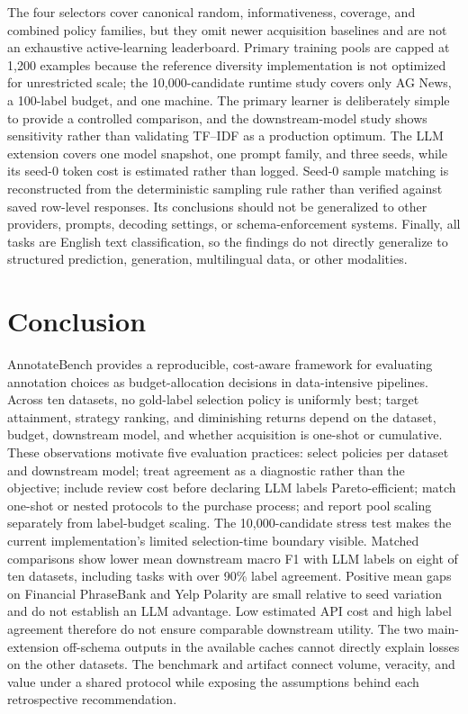 \documentclass[conference]{IEEEtran}
\begin{document}
The four selectors cover canonical random, informativeness, coverage, and combined policy families, but they omit newer acquisition baselines and are not an exhaustive active-learning leaderboard. Primary training pools are capped at 1,200 examples because the reference diversity implementation is not optimized for unrestricted scale; the 10,000-candidate runtime study covers only AG News, a 100-label budget, and one machine. The primary learner is deliberately simple to provide a controlled comparison, and the downstream-model study shows sensitivity rather than validating TF--IDF as a production optimum. The LLM extension covers one model snapshot, one prompt family, and three seeds, while its seed-0 token cost is estimated rather than logged. Seed-0 sample matching is reconstructed from the deterministic sampling rule rather than verified against saved row-level responses. Its conclusions should not be generalized to other providers, prompts, decoding settings, or schema-enforcement systems. Finally, all tasks are English text classification, so the findings do not directly generalize to structured prediction, generation, multilingual data, or other modalities.

\section{Conclusion}
AnnotateBench provides a reproducible, cost-aware framework for evaluating annotation choices as budget-allocation decisions in data-intensive pipelines. Across ten datasets, no gold-label selection policy is uniformly best; target attainment, strategy ranking, and diminishing returns depend on the dataset, budget, downstream model, and whether acquisition is one-shot or cumulative. These observations motivate five evaluation practices: select policies per dataset and downstream model; treat agreement as a diagnostic rather than the objective; include review cost before declaring LLM labels Pareto-efficient; match one-shot or nested protocols to the purchase process; and report pool scaling separately from label-budget scaling. The 10,000-candidate stress test makes the current implementation's limited selection-time boundary visible. Matched comparisons show lower mean downstream macro F1 with LLM labels on eight of ten datasets, including tasks with over 90\% label agreement. Positive mean gaps on Financial PhraseBank and Yelp Polarity are small relative to seed variation and do not establish an LLM advantage. Low estimated API cost and high label agreement therefore do not ensure comparable downstream utility. The two main-extension off-schema outputs in the available caches cannot directly explain losses on the other datasets. The benchmark and artifact connect volume, veracity, and value under a shared protocol while exposing the assumptions behind each retrospective recommendation.



\end{document}
